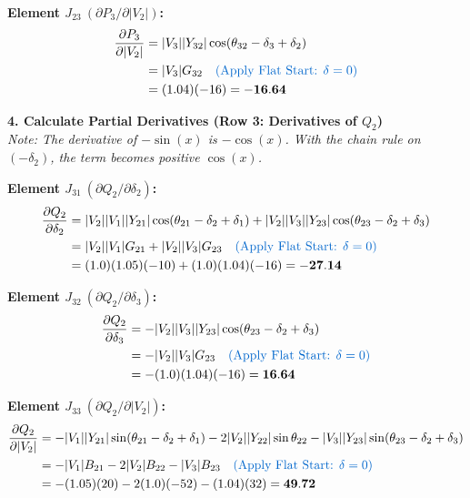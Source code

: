 \documentclass[11pt]{article}
\begin{document}
\begin{stepbox}
\noindent \textbf{Element $J_{23} \ (\partial P_3 / \partial |V_2|)$:}
\begin{align*}
    \frac{\partial P_3}{\partial |V_2|} &= |V_3||Y_{32}|\cos(\theta_{32} - \delta_3 + \delta_2) \\
    &= |V_3|G_{32} \quad \text{\textcolor{mainblue}{(Apply Flat Start: $\delta=0$)}} \\
    &= (1.04)(-16) = \mathbf{-16.64}
\end{align*}

\vspace{0.3cm}
\textbf{4. Calculate Partial Derivatives (Row 3: Derivatives of $Q_2$)}\\
\textit{Note: The derivative of $-\sin(x)$ is $-\cos(x)$. With the chain rule on $(-\delta_2)$, the term becomes positive $\cos(x)$.}

\noindent \textbf{Element $J_{31} \ (\partial Q_2 / \partial \delta_2)$:}
\begin{align*}
    \frac{\partial Q_2}{\partial \delta_2} &= |V_2||V_1||Y_{21}|\cos(\theta_{21} - \delta_2 + \delta_1) + |V_2||V_3||Y_{23}|\cos(\theta_{23} - \delta_2 + \delta_3) \\
    &= |V_2||V_1|G_{21} + |V_2||V_3|G_{23} \quad \text{\textcolor{mainblue}{(Apply Flat Start: $\delta=0$)}} \\
    &= (1.0)(1.05)(-10) + (1.0)(1.04)(-16) = \mathbf{-27.14}
\end{align*}

\noindent \textbf{Element $J_{32} \ (\partial Q_2 / \partial \delta_3)$:}
\begin{align*}
    \frac{\partial Q_2}{\partial \delta_3} &= -|V_2||V_3||Y_{23}|\cos(\theta_{23} - \delta_2 + \delta_3) \\
    &= -|V_2||V_3|G_{23} \quad \text{\textcolor{mainblue}{(Apply Flat Start: $\delta=0$)}} \\
    &= -(1.0)(1.04)(-16) = \mathbf{16.64}
\end{align*}

\noindent \textbf{Element $J_{33} \ (\partial Q_2 / \partial |V_2|)$:}
\begin{align*}
    \frac{\partial Q_2}{\partial |V_2|} &= -|V_1||Y_{21}|\sin(\theta_{21} - \delta_2 + \delta_1) - 2|V_2||Y_{22}|\sin\theta_{22} - |V_3||Y_{23}|\sin(\theta_{23} - \delta_2 + \delta_3) \\
    &= -|V_1|B_{21} - 2|V_2|B_{22} - |V_3|B_{23} \quad \text{\textcolor{mainblue}{(Apply Flat Start: $\delta=0$)}} \\
    &= -(1.05)(20) - 2(1.0)(-52) - (1.04)(32) = \mathbf{49.72}
\end{align*}
\end{stepbox}
\end{document}
